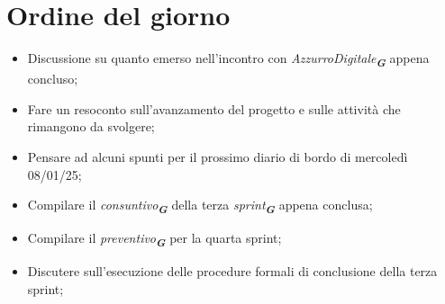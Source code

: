 

\section{Ordine del giorno}

\begin{itemize}
    \item Discussione su quanto emerso nell'incontro con \emph{AzzurroDigitale}\textsubscript{\textit{\textbf{G}}} appena concluso;
    \item Fare un resoconto sull'avanzamento del progetto e sulle attività che rimangono da svolgere;
    \item Pensare ad alcuni spunti per il prossimo diario di bordo di mercoledì 08/01/25;
    \item Compilare il \emph{consuntivo}\textsubscript{\textit{\textbf{G}}} della terza \emph{sprint}\textsubscript{\textit{\textbf{G}}} appena conclusa;
    \item Compilare il \emph{preventivo}\textsubscript{\textit{\textbf{G}}} per la quarta sprint;
    \item Discutere sull'esecuzione delle procedure formali di conclusione della terza sprint;
\end{itemize}
